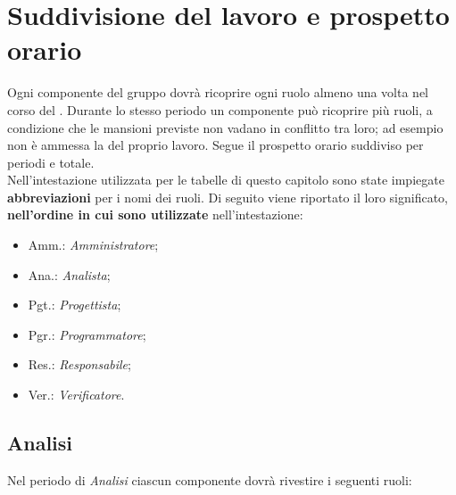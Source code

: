 \section{Suddivisione del lavoro e prospetto orario}
Ogni componente del gruppo dovrà ricoprire ogni ruolo almeno una volta nel corso del .
Durante lo stesso periodo un componente può ricoprire più ruoli, a condizione che le mansioni previste non vadano in conflitto tra loro; ad esempio non è ammessa la  del proprio lavoro.
Segue il prospetto orario suddiviso per periodi e totale. \\

Nell'intestazione utilizzata per le tabelle di questo capitolo sono state impiegate \textbf{abbreviazioni} per i nomi dei ruoli.
Di seguito viene riportato il loro significato, \textbf{nell'ordine in cui sono utilizzate} nell'intestazione:
\begin{itemize}
\item Amm.: \textit{Amministratore};
\item Ana.: \textit{Analista};
\item Pgt.: \textit{Progettista};
\item Pgr.: \textit{Programmatore};
\item Res.: \textit{Responsabile};
\item Ver.: \textit{Verificatore}.
\end{itemize}

\pagebreak
\subsection{Analisi}
Nel periodo di \textit{Analisi} ciascun componente dovrà rivestire i seguenti ruoli:

